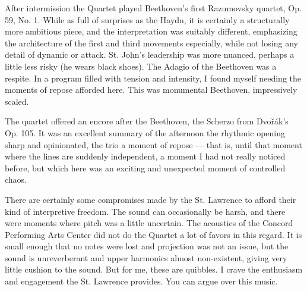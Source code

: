 After intermission the Quartet played Beethoven’s first Razumovsky quartet, Op. 59, No. 1. While as full of surprises as the Haydn, it is certainly a structurally more ambitious piece, and the interpretation was suitably different, emphasizing the architecture of the first and third movements especially, while not losing any detail of dynamic or attack. St. John’s leadership was more nuanced, perhaps a little less risky (he wears black shoes). The Adagio of the Beethoven was a respite. In a program filled with tension and intensity, I found myself needing the moments of repose afforded here. This was monumental Beethoven, impressively scaled.

The quartet offered an encore after the Beethoven, the Scherzo from Dvořák’s Op. 105. It was an excellent summary of the afternoon the rhythmic opening sharp and opinionated, the trio a moment of repose — that is, until that moment where the lines are suddenly independent, a moment I had not really noticed before, but which here was an exciting and unexpected moment of controlled chaos.

There are certainly some compromises made by the St. Lawrence to afford their kind of interpretive freedom. The sound can occasionally be harsh, and there were moments where pitch was a little uncertain. The acoustics of the Concord Performing Arts Center did not do the Quartet a lot of favors in this regard. It is small enough that no notes were lost and projection was not an issue, but the sound is unreverberant and upper harmonics almost non-existent, giving very little cushion to the sound. But for me, these are quibbles. I crave the enthusiasm and engagement the St. Lawrence provides. You can argue over this music.
